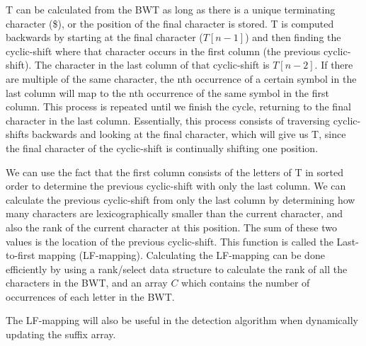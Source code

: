 T can be calculated from the BWT as long as there is a unique terminating character (\$),
or the position of the final character is stored. T is computed backwards by starting at
the final character ($T[n - 1]$) and then finding the cyclic-shift where that character
occurs in the first column (the previous cyclic-shift). The character in the last column
of that cyclic-shift is $T[n - 2]$. If there are multiple of the same character, the nth
occurrence of a certain symbol in the last column will map to the nth occurrence of the
same symbol in the first column. This process is repeated until we finish the cycle,
returning to the final character in the last column. Essentially, this process consists of
traversing cyclic-shifts backwards and looking at the final character, which will give us
T, since the final character of the cyclic-shift is continually shifting one position.

We can use the fact that the first column consists of the letters of T in sorted order to
determine the previous cyclic-shift with only the last column. We can calculate the
previous cyclic-shift from only the last column by determining how many characters are
lexicographically smaller than the current character, and also the rank of the current
character at this position. The sum of these two values is the location of the previous
cyclic-shift. This function is called the Last-to-first mapping (LF-mapping). Calculating
the LF-mapping can be done efficiently by using a rank/select data structure to calculate
the rank of all the characters in the BWT, and an array $C$ which contains the number of
occurrences of each letter in the BWT.

The LF-mapping will also be useful in the detection algorithm when dynamically updating
the suffix array.
